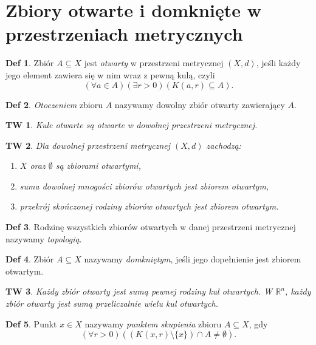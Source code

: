 \documentclass[a4paper, 12pt]{mwart}
\theoremstyle{definition}
\newtheorem{definicja}{Def}[section]
\theoremstyle{plain}
\newtheorem{twierdzenie}{TW}[section]
\theoremstyle{remark}
\begin{document}
\section{Zbiory otwarte i domknięte w przestrzeniach metrycznych}
\begin{definicja}
	Zbiór $A \subseteq X$ jest \emph{otwarty} w przestrzeni metrycznej $(X, d)$, jeśli każdy jego element zawiera się w nim wraz z pewną kulą, czyli
	\begin{equation}
		\left(\forall a \in A\right)\left(\exists r > 0\right)\left(K(a, r) \subseteq A\right).
	\end{equation}
\end{definicja}
\begin{definicja}
	\emph{Otoczeniem} zbioru $A$ nazywamy dowolny zbiór otwarty zawierający $A$.
\end{definicja}
\begin{twierdzenie}
	Kule otwarte są otwarte w dowolnej przestrzeni metrycznej.
\end{twierdzenie}
\begin{twierdzenie} \label{otwarte}
	Dla dowolnej przestrzeni metrycznej $(X, d)$ zachodzą:
	\begin{enumerate}
		\item $X$ oraz $\emptyset$ są zbiorami otwartymi,
		\item suma dowolnej mnogości zbiorów otwartych jest zbiorem otwartym,
		\item przekrój skończonej rodziny zbiorów otwartych jest zbiorem otwartym.
	\end{enumerate}
\end{twierdzenie}
\begin{definicja} \label{topologia}
	Rodzinę wszystkich zbiorów otwartych w danej przestrzeni metrycznej nazywamy \emph{topologią}.
\end{definicja}
\begin{definicja}
	Zbiór $A \subseteq X$ nazywamy \emph{domkniętym}, jeśli jego dopełnienie jest zbiorem otwartym.
\end{definicja}
\begin{twierdzenie}
	Każdy zbiór otwarty jest sumą pewnej rodziny kul otwartych. W $\mathbb{R}^n$, każdy zbiór otwarty jest sumą przeliczalnie wielu kul otwartych.
\end{twierdzenie}
\begin{definicja}
	Punkt $x \in X$ nazywamy \emph{punktem skupienia} zbioru $A \subseteq X$, gdy
	\begin{equation}
		\left(\forall r > 0\right)\left((K(x, r) \setminus \{x\}) \cap A \neq \emptyset\right).
	\end{equation}
\end{definicja}
\end{document}
